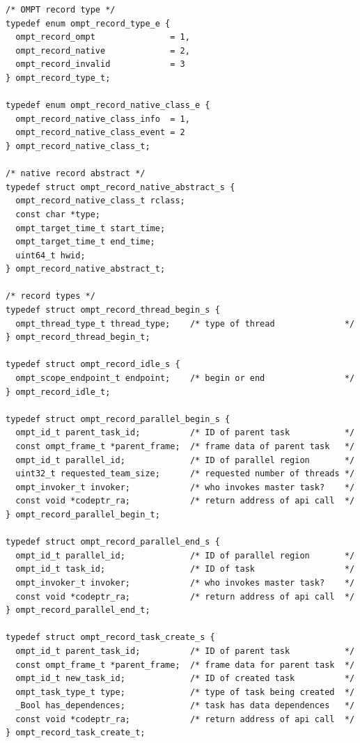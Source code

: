 \documentclass{article}
\begin{document}
\begin{verbatim}
/* OMPT record type */
typedef enum ompt_record_type_e {
  ompt_record_ompt               = 1,
  ompt_record_native             = 2,
  ompt_record_invalid            = 3
} ompt_record_type_t; 

typedef enum ompt_record_native_class_e {
  ompt_record_native_class_info  = 1,
  ompt_record_native_class_event = 2
} ompt_record_native_class_t;

/* native record abstract */
typedef struct ompt_record_native_abstract_s {
  ompt_record_native_class_t rclass;
  const char *type;
  ompt_target_time_t start_time;
  ompt_target_time_t end_time;
  uint64_t hwid;
} ompt_record_native_abstract_t;

/* record types */
typedef struct ompt_record_thread_begin_s {
  ompt_thread_type_t thread_type;    /* type of thread              */
} ompt_record_thread_begin_t;

typedef struct ompt_record_idle_s {
  ompt_scope_endpoint_t endpoint;    /* begin or end                */
} ompt_record_idle_t;

typedef struct ompt_record_parallel_begin_s {
  ompt_id_t parent_task_id;          /* ID of parent task           */
  const ompt_frame_t *parent_frame;  /* frame data of parent task   */
  ompt_id_t parallel_id;             /* ID of parallel region       */
  uint32_t requested_team_size;      /* requested number of threads */
  ompt_invoker_t invoker;            /* who invokes master task?    */
  const void *codeptr_ra;            /* return address of api call  */ 
} ompt_record_parallel_begin_t;

typedef struct ompt_record_parallel_end_s {
  ompt_id_t parallel_id;             /* ID of parallel region       */
  ompt_id_t task_id;                 /* ID of task                  */
  ompt_invoker_t invoker;            /* who invokes master task?    */
  const void *codeptr_ra;            /* return address of api call  */ 
} ompt_record_parallel_end_t;

typedef struct ompt_record_task_create_s {
  ompt_id_t parent_task_id;          /* ID of parent task           */
  const ompt_frame_t *parent_frame;  /* frame data for parent task  */
  ompt_id_t new_task_id;             /* ID of created task          */
  ompt_task_type_t type;             /* type of task being created  */ 
  _Bool has_dependences;             /* task has data dependences   */
  const void *codeptr_ra;            /* return address of api call  */ 
} ompt_record_task_create_t;


\end{verbatim}
\end{document}
